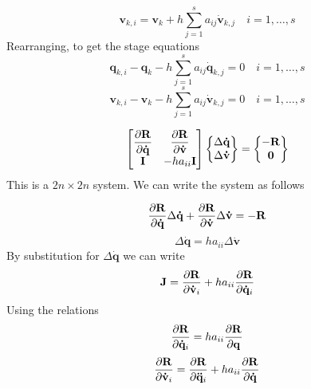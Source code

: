 \documentclass[pdftex,11pt,letter]{article}
\begin{document}
\begin{multicols}{2}
\begin{equation}
  \mathbf{v}_{k,i} = \mathbf{v}_{k} + h \sum_{j=1}^s a_{ij} \mathbf{\dot{v}}_{k,j} \quad i = 1,\ldots,s 
\end{equation}
Rearranging, to get the stage equations
\begin{equation}
  \mathbf{q}_{k,i} - \mathbf{q}_{k} - h \sum_{j=1}^s a_{ij}
  \mathbf{\dot{q}}_{k,j} = 0 \quad i = 1,\ldots,s
\end{equation}
\begin{equation}
  \mathbf{{v}}_{k,i} - \mathbf{v}_{k} - h \sum_{j=1}^s a_{ij}
  \mathbf{\dot{v}}_{k,j} = 0 \quad i = 1,\ldots,s
\end{equation}

\begin{equation}
  \begin{bmatrix}
    \mathbf{\dfrac{\partial R}{\partial \dot{q}}} & \mathbf{\dfrac{\partial R}{\partial \dot{v}}} \\
    \mathbf{I} & -h a_{ii}\mathbf{I}\\
  \end{bmatrix}   \begin{Bmatrix}
    \Delta{\mathbf{\dot{q}}} \\
    \Delta{\mathbf{\dot{v}}} \\
  \end{Bmatrix} =    \begin{Bmatrix}
    -\mathbf{R} \\ \mathbf{0}
  \end{Bmatrix}
\end{equation}
This is a $2n \times 2n$ system. We can write the system as follows

\begin{equation}
 \mathbf{\dfrac{\partial R}{\partial \dot{q}}} \Delta \mathbf{\dot{q}} +
 \mathbf{\dfrac{\partial R}{\partial \dot{v}}} \Delta \mathbf{\dot{v}} = -\mathbf{R}
\end{equation}
\begin{equation}
  \Delta \mathbf{\dot{q}} = h a_{ii} \Delta \mathbf{\dot{v}}
\end{equation}
By substitution for $\Delta \mathbf{\dot{q}} $ we can write
\begin{equation}
  \mathbf{J} = \dfrac{\partial \mathbf{R}}{\partial \mathbf{\dot{v}}_{i}} + h a_{ii}
  \dfrac{\partial \mathbf{R}}{\partial \mathbf{\dot{q}}_{i}}
\end{equation}
Using the relations
\begin{equation}
  \dfrac{\partial \mathbf{R}}{\partial \mathbf{\dot{q}}_{i}} = h a_{ii} \dfrac{\partial \mathbf{R}}{\partial \mathbf{{q}}}
\end{equation}
\begin{equation}
  \dfrac{\partial \mathbf{R}}{\partial \mathbf{\dot{v}}_{i}} =  \dfrac{\partial \mathbf{R}}{\partial \mathbf{\ddot{q}}_{i}} + h a_{ii} \dfrac{\partial \mathbf{R}}{\partial \mathbf{\dot{q}}} 
\end{equation}


\end{multicols}
\end{document}
